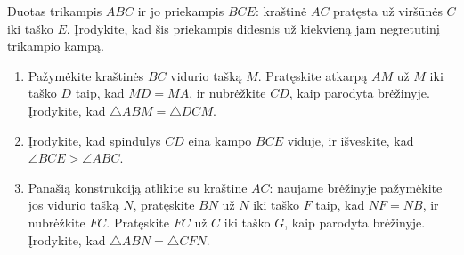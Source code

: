 \documentclass[12pt,a4paper,reqno]{amsart}
\newcommand{\krastineszymek}[1]{\tikz[baseline=(current bounding box.center)]{\foreach \x in {#1}{\draw (\x pt,-2.5pt)--(\x pt,2.5pt);}}}
\theoremstyle{plain}\newtheorem{theorem}{Teorema}[section]
\theoremstyle{definition}
\theoremstyle{remark}\newtheorem{remark}[theorem]{Pastaba}\newtheorem*{remark*}{Pastaba}
\theoremstyle{definition}\newtheorem*{problem*}{Uždavinys}
\newenvironment{staranchorproblem}{\begingroup\let\numberwithoutstar\thetheorem\renewcommand{\thetheorem}{\numberwithoutstar\textsuperscript{*}}\begin{anchorproblem}}{\end{anchorproblem}\endgroup}
\begin{document}
\begin{staranchorproblem}[Trikampio priekampio nelygybė]\label{atr:priekampis-nelygybe}
Duotas trikampis $ABC$ ir jo priekampis $BCE$: kraštinė $AC$ pratęsta už viršūnės $C$ iki taško $E$. Įrodykite, kad šis priekampis didesnis už kiekvieną jam negretutinį trikampio kampą.
\begin{center}
\end{center}
\begin{enumerate}[label=\alph*),leftmargin=*]
\item Pažymėkite kraštinės $BC$ vidurio tašką $M$. Pratęskite atkarpą $AM$ už $M$ iki taško $D$ taip, kad $MD=MA$, ir nubrėžkite $CD$, kaip parodyta brėžinyje. Įrodykite, kad $\triangle ABM=\triangle DCM$.
\begin{center}
\end{center}
\item Įrodykite, kad spindulys $CD$ eina kampo $BCE$ viduje, ir išveskite, kad $\angle BCE>\angle ABC$.
\item Panašią konstrukciją atlikite su kraštine $AC$: naujame brėžinyje pažymėkite jos vidurio tašką $N$, pratęskite $BN$ už $N$ iki taško $F$ taip, kad $NF=NB$, ir nubrėžkite $FC$. Pratęskite $FC$ už $C$ iki taško $G$, kaip parodyta brėžinyje. Įrodykite, kad $\triangle ABN=\triangle CFN$.
\begin{center}
\begin{tikzpicture}[scale=.8]

\end{tikzpicture}
\end{center}
\end{enumerate}
\end{staranchorproblem}
\end{document}
